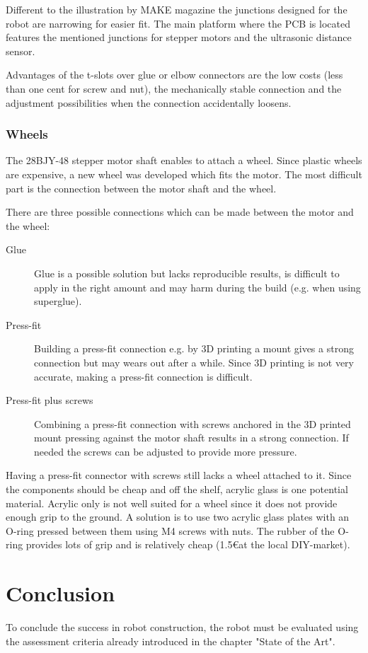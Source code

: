 \documentclass[11pt,a4paper]{article}
\begin{document}
Different to the illustration by MAKE magazine the junctions designed for the robot are narrowing for easier fit. The main platform where the PCB is located features the mentioned junctions for stepper motors and the ultrasonic distance sensor.

Advantages of the t-slots over glue or elbow connectors are the low costs (less than one cent for screw and nut), the mechanically stable connection and the adjustment possibilities when the connection accidentally loosens.
 
\subsubsection{Wheels}

The 28BJY-48 stepper motor shaft enables to attach a wheel. Since plastic wheels are expensive, a new wheel was developed which fits the motor. The most difficult part is the connection between the motor shaft and the wheel.

There are three possible connections which can be made between the motor and the wheel:
\begin{description}
\item[Glue] Glue is a possible solution but lacks reproducible results, is difficult to apply in the right amount and may harm during the build (e.g. when using superglue).
\item[Press-fit] Building a press-fit connection e.g. by 3D printing a mount gives a strong connection but may wears out after a while. Since 3D printing is not very accurate, making a press-fit connection is difficult.
\item[Press-fit plus screws] Combining a press-fit connection with screws anchored in the 3D printed mount pressing against the motor shaft results in a strong connection. If needed the screws can be adjusted to provide more pressure.
\end{description}

Having a press-fit connector with screws still lacks a wheel attached to it. Since the components should be cheap and off the shelf, acrylic glass is one potential material.
Acrylic only is not well suited for a wheel since it does not provide enough grip to the ground. A solution is to use two acrylic glass plates with an O-ring pressed between them using M4 screws with nuts. The rubber of the O-ring provides lots of grip and is relatively cheap (1.5\euro at the local DIY-market).

\section{Conclusion}
To conclude the success in robot construction, the robot must be evaluated using the assessment criteria already introduced in the chapter "State of the Art". 
\end{document}
